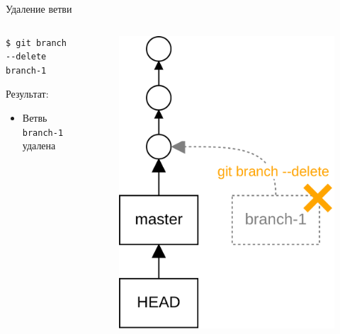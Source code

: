 \documentclass[presentation]{beamer}
\begin{document}
\begin{frame}[fragile]{Удаление ветви}
  \begin{columns}
    \begin{column}{.4\textwidth}
\begin{verbatim}
$ git branch --delete branch-1
\end{verbatim}
      Результат:
      \begin{itemize}
      \item Ветвь \texttt{branch-1} удалена
      \end{itemize}
      \end{column}
      \begin{column}{.6\textwidth}
        \begin{figure}[htb]
          \centering
          \includegraphics[height=.7\textheight]{git-operation-merge-1-3}
        \end{figure}
      \end{column}
    \end{columns}
\end{frame}
\end{document}
